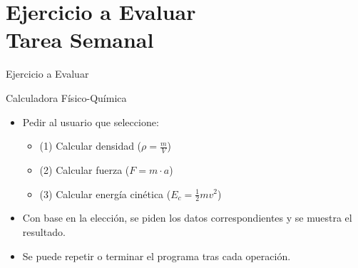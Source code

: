 \documentclass[10pt]{beamer}
\begin{document}
\section{Ejercicio a Evaluar \\ Tarea Semanal}
\begin{frame}{Ejercicio a Evaluar}
  \begin{block}{Calculadora Físico-Química}
    \begin{itemize}
      \item Pedir al usuario que seleccione:
        \begin{itemize}
          \item (1) Calcular densidad (\(\rho = \frac{m}{V}\))
          \item (2) Calcular fuerza (\(F = m \cdot a\))
          \item (3) Calcular energía cinética (\(E_c = \frac{1}{2}mv^2\))
        \end{itemize}
      \item Con base en la elección, se piden los datos correspondientes y se muestra el resultado.
      \item Se puede repetir o terminar el programa tras cada operación.
    \end{itemize}
  \end{block}
\end{frame}

\end{document}
